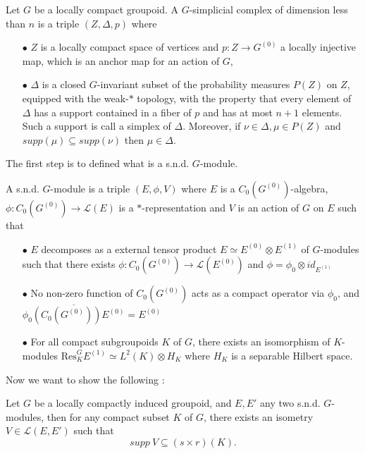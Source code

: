 \begin{definition}
Let $G$ be a locally compact groupoid. A $G$-simplicial complex of dimension less than $n$ is a triple $(Z,\Delta, p)$ where
\begin{itemize}
\item[$\bullet$] $Z$ is a locally compact space of vertices and $p: Z \rightarrow G^{(0)}$ a locally injective map, which is an anchor map for an action of $G$, 
\item[$\bullet$] $\Delta$ is a closed $G$-invariant subset of the probability measures $P(Z)$ on $Z$, equipped with the weak-$*$ topology, with the property that every element of $\Delta$ has a support contained in a fiber of $p$ and has at most $n+1$ elements. Such a support is call a simplex of $\Delta$. Moreover, if $\nu\in \Delta,\mu \in P(Z)$ and $supp(\mu)\subseteq supp(\nu)$ then $\mu\in \Delta$.
\end{itemize}
\end{definition}

The first step is to defined what is a s.n.d. $G$-module.

\begin{definition}
A s.n.d. $G$-module is a triple $(E,\phi,V)$ where $E$ is a $C_0(G^{(0)})$-algebra, $\phi : C_0(G^{(0)})\rightarrow \mathcal L(E)$ is a $*$-representation and $V$ is an action of $G$ on $E$ such that
\begin{itemize}
\item[$\bullet$] $E$ decomposes as a external tensor product $E\simeq E^{(0)}\otimes E^{(1)}$ of $G$-modules such that there exists $\phi : C_0(G^{(0)})\rightarrow \mathcal L(E^{(0)})$ and $\phi= \phi_0\otimes id_{E^{(1)}}$
\item[$\bullet$] No non-zero function of $C_0(G^{(0)})$ acts as a compact operator via $\phi_0$, and $\overline{\phi_0(C_0(G^{(0)}))E^{(0)} }= E^{(0)}$
\item[$\bullet$] For all compact subgroupoids $K$ of $G$, there exists an isomorphism of $K$-modules $\text{Res}_K^G E^{(1)} \simeq L^2(K)\otimes H_K$ where $H_K$ is a separable Hilbert space.
\end{itemize}
\end{definition}

Now we want to show the following :

\begin{lem}
Let $G$ be a locally compactly induced groupoid, and $E,E'$ any two s.n.d. $G$-modules, then for any compact subset $K$ of $G$, there exists an isometry $V\in \mathcal L(E,E')$ such that 
\[supp\ V \subseteq (s\times r)(K). \]
\end{lem}

